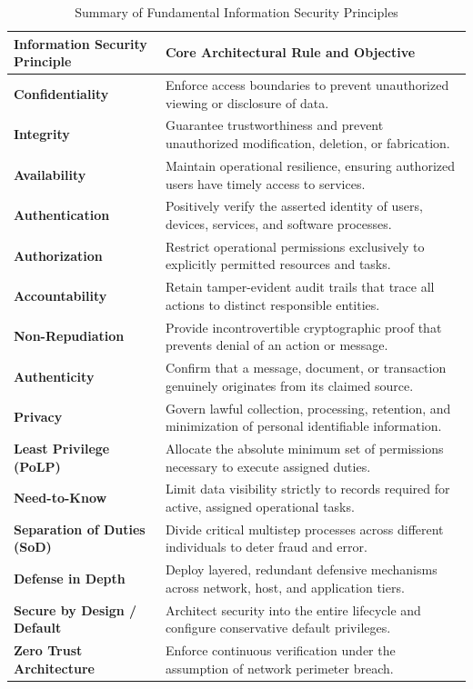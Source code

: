 \begin{table}[htbp]
\centering
\caption{Summary of Fundamental Information Security Principles}
\label{tab:info_sec_principles}
\begin{tabularx}{\textwidth}{p{4.5cm} X}
\toprule
\textbf{Information Security Principle} & \textbf{Core Architectural Rule and Objective} \\
\midrule
\textbf{Confidentiality} & Enforce access boundaries to prevent unauthorized viewing or disclosure of data. \\
\textbf{Integrity} & Guarantee trustworthiness and prevent unauthorized modification, deletion, or fabrication. \\
\textbf{Availability} & Maintain operational resilience, ensuring authorized users have timely access to services. \\
\textbf{Authentication} & Positively verify the asserted identity of users, devices, services, and software processes. \\
\textbf{Authorization} & Restrict operational permissions exclusively to explicitly permitted resources and tasks. \\
\textbf{Accountability} & Retain tamper-evident audit trails that trace all actions to distinct responsible entities. \\
\textbf{Non-Repudiation} & Provide incontrovertible cryptographic proof that prevents denial of an action or message. \\
\textbf{Authenticity} & Confirm that a message, document, or transaction genuinely originates from its claimed source. \\
\textbf{Privacy} & Govern lawful collection, processing, retention, and minimization of personal identifiable information. \\
\textbf{Least Privilege (PoLP)} & Allocate the absolute minimum set of permissions necessary to execute assigned duties. \\
\textbf{Need-to-Know} & Limit data visibility strictly to records required for active, assigned operational tasks. \\
\textbf{Separation of Duties (SoD)} & Divide critical multistep processes across different individuals to deter fraud and error. \\
\textbf{Defense in Depth} & Deploy layered, redundant defensive mechanisms across network, host, and application tiers. \\
\textbf{Secure by Design / Default} & Architect security into the entire lifecycle and configure conservative default privileges. \\
\textbf{Zero Trust Architecture} & Enforce continuous verification under the assumption of network perimeter breach. \\
\bottomrule
\end{tabularx}
\end{table}


